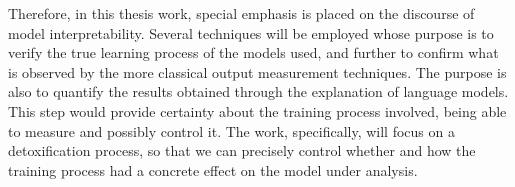 Therefore, in this thesis work, special emphasis is placed on the discourse of model interpretability. Several techniques will be employed whose purpose is to verify the true learning process of the models used, and further to confirm what is observed by the more classical output measurement techniques. The purpose is also to quantify the results obtained through the explanation of language models. This step would provide certainty about the training process involved, being able to measure and possibly control it. The work, specifically, will focus on a detoxification process, so that we can precisely control whether and how the training process had a concrete effect on the model under analysis.

